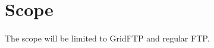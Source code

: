\section{Scope}
\paragraph{}
The scope will be limited to GridFTP\cite{GridFTPv2} and regular FTP\cite{FTPrfc959}.